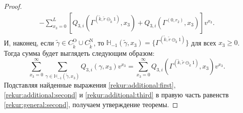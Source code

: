 \begin{proof}
\begin{multline}
-\sum_{x_3=0}^{L} \left[ Q_{3, i}(\Gamma^{(\tilde{k}, \tilde{r}\ominus_{\tilde{k}} 1)}, x_3) + Q_{3, i}(\Gamma^{(0, r_2)}, x_3) \right] v^{x_3}.
\label{rekur:additional:second}
\end{multline}
И,  наконец,  если $\tilde{\gamma}\in C_{\tilde{k}}^{\mathrm{O}} \cup C_{\tilde{k}}^{\mathrm{N}}$,  то ${\mathbb H}_{-1}(\tilde{\gamma}, x_3) = \{\Gamma^{(\tilde{k}, \tilde{r}\ominus_{\tilde{k}} 1)}\}$ для всех $x_3\geqslant 0$. Тогда сумма будет выглядеть следующим образом:
\begin{equation}
\sum_{x_3=0}^{\infty} \sum_{\gamma \in {\mathbb H}_{-1}(\tilde{\gamma}, x_3)} Q_{3, i}(\gamma, x_3) v^{x_3} = \sum_{x_3=0}^{\infty} Q_{3, i}(\Gamma^{(\tilde{k}, \tilde{r}\ominus_{\tilde{k}} 1)}, x_3) v^{x_3}.
\label{rekur:additional:third}
\end{equation}
Подставляя найденные выражения \eqref{rekur:additional:first},  \eqref{rekur:additional:second} и \eqref{rekur:additional:third} в правую часть равенств \eqref{rekur:general:second},  получаем утверждение теоремы.
\end{proof}

